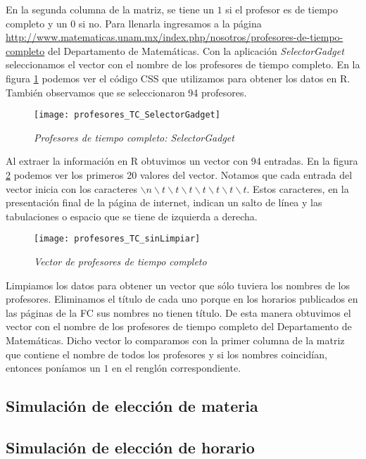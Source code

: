 En la segunda columna de la matriz, se tiene un $1$ si el profesor es de tiempo completo y un $0$ si no. Para llenarla ingresamos a la página \url{http://www.matematicas.unam.mx/index.php/nosotros/profesores-de-tiempo-completo} del Departamento de Matemáticas. Con la aplicación \textit{SelectorGadget} seleccionamos el vector con el nombre de los profesores de tiempo completo. En la figura \ref{profTC_SelectorGadget} podemos ver el código CSS que utilizamos para obtener los datos en R. También observamos que se seleccionaron 94 profesores.

\begin{figure}[H]
\centering
\texttt{[image: profesores\_TC\_SelectorGadget]} %
\caption{\textit{Profesores de tiempo completo: SelectorGadget}}\label{profTC_SelectorGadget}
\end{figure}

Al extraer la información en R obtuvimos un vector con 94 entradas. En la figura \ref{profTC_sinLimpiar} podemos ver los primeros 20 valores del vector. Notamos que cada entrada del vector inicia con los caracteres $\backslash n \backslash t \backslash t \backslash t \backslash t \backslash t \backslash t \backslash t$. Estos caracteres, en la presentación final de la página de internet, indican un salto de línea y las tabulaciones o espacio que se tiene de izquierda a derecha.

\begin{figure}[H]
\centering
\texttt{[image: profesores\_TC\_sinLimpiar]} %
\caption{\textit{Vector de profesores de tiempo completo}}\label{profTC_sinLimpiar}
\end{figure}

Limpiamos los datos para obtener un vector que sólo tuviera los nombres de los profesores. Eliminamos el título de cada uno porque en los horarios publicados en las páginas de la FC sus nombres no tienen título. De esta manera obtuvimos el vector con el nombre de los profesores de tiempo completo del Departamento de Matemáticas. Dicho vector lo comparamos con la primer columna de la matriz que contiene el nombre de todos los profesores y si los nombres coincidían, entonces poníamos un $1$ en el renglón correspondiente.

\subsection{Simulación de elección de materia}

\subsection{Simulación de elección de horario}






